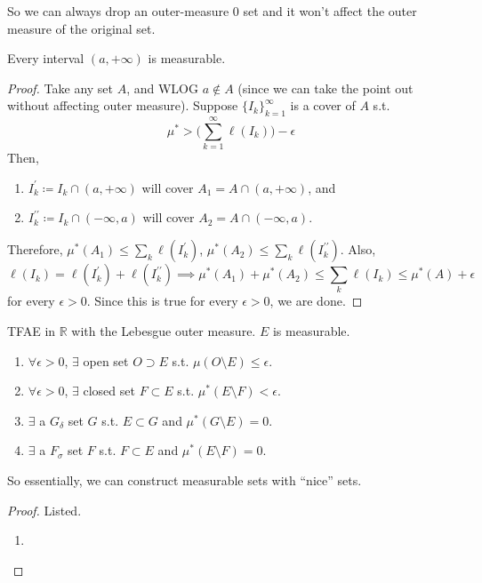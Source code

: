   So we can always drop an outer-measure $0$ set and it won't affect the outer measure of the original set. 

  \begin{theorem}
    Every interval $(a, +\infty)$ is measurable. 
  \end{theorem}
  \begin{proof}
    Take any set $A$, and WLOG $a \not\in A$ (since we can take the point out without affecting outer measure). Suppose $\{I_k\}_{k=1}^\infty$ is a cover of $A$ s.t. 
    \begin{equation}
      \mu^\ast > \bigg( \sum_{k=1}^\infty \ell (I_k) \bigg) - \epsilon 
    \end{equation}
    Then, 
    \begin{enumerate}
      \item $I_k^\prime \coloneqq I_k \cap (a, +\infty)$ will cover $A_1 = A \cap (a, +\infty)$, and 
      \item $I_k^{\prime\prime} \coloneqq I_k \cap (-\infty, a)$ will cover $A_2 = A \cap (-\infty, a)$. 
    \end{enumerate}
    Therefore, $\mu^\ast (A_1)  \leq \sum_k \ell(I_k^\prime)$, $\mu^\ast (A_2) \leq \sum_k \ell(I_k^{\prime\prime})$. Also, 
    \begin{equation}
      \ell(I_k) = \ell(I_k^\prime) + \ell(I_k^{\prime\prime}) \implies \mu^\ast (A_1) + \mu^\ast (A_2) \leq \sum_k \ell(I_k) \leq \mu^\ast (A) + \epsilon
    \end{equation}
    for every $\epsilon > 0$. Since this is true for every $\epsilon > 0$, we are done.  
  \end{proof}

  \begin{theorem}
    TFAE in $\mathbb{R}$ with the Lebesgue outer measure. $E$ is measurable. 
    \begin{enumerate}
      \item $\forall \epsilon > 0$, $\exists$ open set $O \supset E$  s.t. $\mu(O \setminus E) \leq \epsilon$. 
      \item $\forall \epsilon > 0$, $\exists$ closed set $F \subset E$ s.t. $\mu^\ast (E \setminus F) < \epsilon$. 
      \item $\exists$ a $G_\delta$ set $G$ s.t. $E \subset G$ and $\mu^\ast (G \setminus E) = 0$. 
      \item $\exists$ a $F_\sigma$ set $F$ s.t. $F \subset E$ and $\mu^\ast (E \setminus F) = 0$. 
    \end{enumerate}
    So essentially, we can construct measurable sets with ``nice'' sets. 
  \end{theorem}
  \begin{proof}
    Listed. 
    \begin{enumerate}
      \item 
    \end{enumerate}
  \end{proof}

